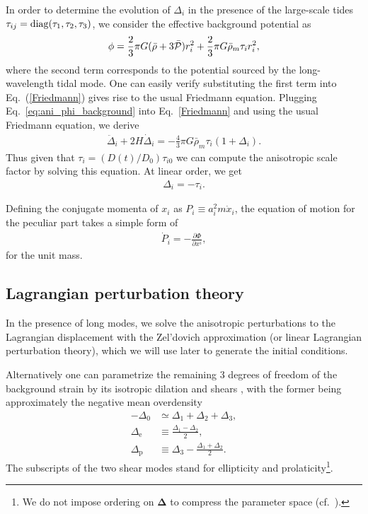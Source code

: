 \documentclass[a4paper,11pt]{article}
\newcommand{\vDelta}{{\bm\Delta}}
\begin{document}
In order to determine the evolution of $\Delta_i$ in the presence of the large-scale tides $\tau_{ij}={\rm diag}(\tau_1,\tau_2,\tau_3)$,
we consider the effective background potential as
\begin{align}
    \phi = \frac{2}{3}\pi G(\bar{\rho}+3\bar{\cal P}) r_i^2
            +\frac{2}{3}\pi G\bar{\rho}_m\tau_i r_i^2,
            \label{eq:ani_phi_background}
\end{align}
where the second term corresponds to the potential sourced by the long-wavelength tidal mode.
One can easily verify substituting the first term into Eq.~(\ref{Friedmann}) 
gives rise to the usual Friedmann equation.
Plugging Eq.~\eqref{eq:ani_phi_background} into Eq.~\eqref{Friedmann} 
and using the usual Friedmann equation,
we derive
\begin{align}
    \ddot \Delta_i + 2H\dot \Delta_i 
    = -\frac{4}{3}\pi G \bar{\rho}_m\tau_i (1+\Delta_i).
\end{align}
Thus given that $\tau_i = (D(t)/D_0)\tau_{i0}$ we can compute the anisotropic scale factor 
by solving this equation.
At linear order, we get
\begin{align}
    \Delta_i = -\tau_i.
    \label{eq:Di_taui}
\end{align}

Defining the conjugate momenta of $x_{i}$ as $P_{i}\equiv a_i^2 m \dot x_{i}$,
the equation of motion for the peculiar part takes a simple form of
\begin{align}
    \dot P_{i} = - \frac{\partial \Phi}{\partial x^i},
    \label{eq:mod_EoM}
\end{align}
for the unit mass.



\subsection{Lagrangian perturbation theory}
\label{sub:lpt}

In the presence of long modes, we solve the anisotropic perturbations to the
Lagrangian displacement with the Zel'dovich approximation (or linear Lagrangian
perturbation theory), which we will use later to generate the initial
conditions.

Alternatively one can parametrize the remaining 3 degrees of freedom of the
background strain by its isotropic dilation and shears \cite{BondMyers96I},
with the former being approximately the negative mean overdensity
\begin{align}
    -\Delta_0 &\simeq \Delta_1 + \Delta_2 + \Delta_3, \nonumber\\
    \Delta_\mathrm{e} &\equiv \frac{\Delta_1 - \Delta_2}2, \nonumber\\
    \Delta_\mathrm{p} &\equiv \Delta_3 - \frac{\Delta_1 + \Delta_2}2.
\end{align}
The subscripts of the two shear modes stand for ellipticity and
prolaticity\footnote{We do not impose ordering on $\vDelta$ to compress the
parameter space (cf.\ \cite{BondMyers96I}).}.
\end{document}
